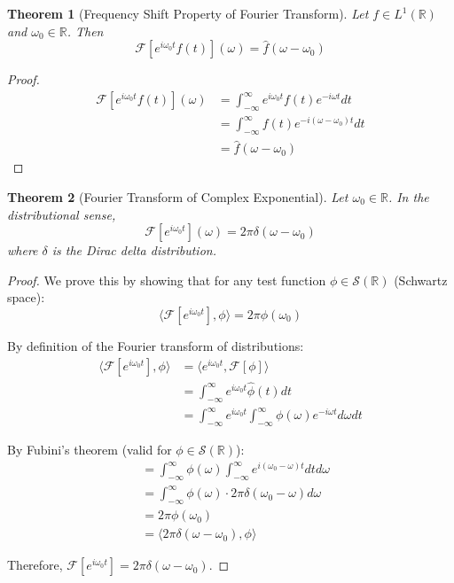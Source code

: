\documentclass{article}
\theoremstyle{plain}
\newtheorem{theorem}{Theorem}
\theoremstyle{definition}
\begin{document}
\begin{theorem}[Frequency Shift Property of Fourier Transform]
Let $f \in L^1(\mathbb{R})$ and $\omega_0 \in \mathbb{R}$. Then
\[\mathcal{F}[e^{i\omega_0 t}f(t)](\omega) = \hat{f}(\omega - \omega_0)\]
\end{theorem}

\begin{proof}
\begin{align}
\mathcal{F}[e^{i\omega_0 t}f(t)](\omega) &= \int_{-\infty}^{\infty} e^{i\omega_0 t}f(t)e^{-i\omega t} dt \\
&= \int_{-\infty}^{\infty} f(t)e^{-i(\omega - \omega_0)t} dt \\
&= \hat{f}(\omega - \omega_0)
\end{align}
\end{proof}

\begin{theorem}[Fourier Transform of Complex Exponential]
Let $\omega_0 \in \mathbb{R}$. In the distributional sense,
\[\mathcal{F}[e^{i\omega_0 t}](\omega) = 2\pi\delta(\omega - \omega_0)\]
where $\delta$ is the Dirac delta distribution.
\end{theorem}

\begin{proof}
We prove this by showing that for any test function $\phi \in \mathcal{S}(\mathbb{R})$ (Schwartz space):
\[\langle \mathcal{F}[e^{i\omega_0 t}], \phi \rangle = 2\pi\phi(\omega_0)\]

By definition of the Fourier transform of distributions:
\begin{align}
\langle \mathcal{F}[e^{i\omega_0 t}], \phi \rangle &= \langle e^{i\omega_0 t}, \mathcal{F}[\phi] \rangle \\
&= \int_{-\infty}^{\infty} e^{i\omega_0 t} \hat{\phi}(t) dt \\
&= \int_{-\infty}^{\infty} e^{i\omega_0 t} \int_{-\infty}^{\infty} \phi(\omega)e^{-i\omega t} d\omega dt
\end{align}

By Fubini's theorem (valid for $\phi \in \mathcal{S}(\mathbb{R})$):
\begin{align}
&= \int_{-\infty}^{\infty} \phi(\omega) \int_{-\infty}^{\infty} e^{i(\omega_0 - \omega)t} dt d\omega \\
&= \int_{-\infty}^{\infty} \phi(\omega) \cdot 2\pi\delta(\omega_0 - \omega) d\omega \\
&= 2\pi\phi(\omega_0) \\
&= \langle 2\pi\delta(\omega - \omega_0), \phi \rangle
\end{align}

Therefore, $\mathcal{F}[e^{i\omega_0 t}] = 2\pi\delta(\omega - \omega_0)$.
\end{proof}
\end{document}
